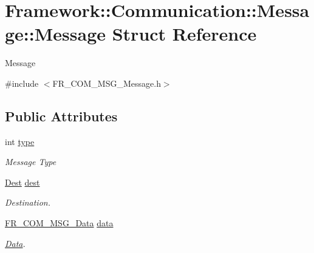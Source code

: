 \hypertarget{structFramework_1_1Communication_1_1Message_1_1Message}{
\section{Framework::Communication::Message::Message Struct Reference}
\label{structFramework_1_1Communication_1_1Message_1_1Message}
}


Message  


{\ttfamily \#include $<$FR\_\-COM\_\-MSG\_\-Message.h$>$}\subsection*{Public Attributes}
\begin{DoxyCompactItemize}
\item 
\hypertarget{structFramework_1_1Communication_1_1Message_1_1Message_aea74e563b8b287786100207b7be2e116}{
int \hyperlink{structFramework_1_1Communication_1_1Message_1_1Message_aea74e563b8b287786100207b7be2e116}{type}}
\label{structFramework_1_1Communication_1_1Message_1_1Message_aea74e563b8b287786100207b7be2e116}

\begin{DoxyCompactList}\small\item\em Message Type \item\end{DoxyCompactList}\item 
\hypertarget{structFramework_1_1Communication_1_1Message_1_1Message_a1ab8ec1a2fdb88aead3ce10c64e9933b}{
\hyperlink{structFramework_1_1Communication_1_1Message_1_1Dest}{Dest} \hyperlink{structFramework_1_1Communication_1_1Message_1_1Message_a1ab8ec1a2fdb88aead3ce10c64e9933b}{dest}}
\label{structFramework_1_1Communication_1_1Message_1_1Message_a1ab8ec1a2fdb88aead3ce10c64e9933b}

\begin{DoxyCompactList}\small\item\em Destination. \item\end{DoxyCompactList}\item 
\hypertarget{structFramework_1_1Communication_1_1Message_1_1Message_a9a8aea25c7880e8e629d977005efcbab}{
\hyperlink{structFramework_1_1Communication_1_1Message_1_1Data}{FR\_\-COM\_\-MSG\_\-Data} \hyperlink{structFramework_1_1Communication_1_1Message_1_1Message_a9a8aea25c7880e8e629d977005efcbab}{data}}
\label{structFramework_1_1Communication_1_1Message_1_1Message_a9a8aea25c7880e8e629d977005efcbab}

\begin{DoxyCompactList}\small\item\em \hyperlink{structFramework_1_1Communication_1_1Message_1_1Data}{Data}. \item\end{DoxyCompactList}\end{DoxyCompactItemize}


